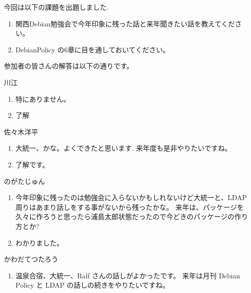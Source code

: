 \documentclass[mingoth,a4paper]{jsarticle}
\begin{document}

今回は以下の課題を出題しました.
\begin{screen}
  \begin{enumerate}
  \item 関西Debian勉強会で今年印象に残った話と来年聞きたい話を教えてください。
  \item DebianPolicy の6章に目を通しておいてください。
  \end{enumerate}
\end{screen}

参加者の皆さんの解答は以下の通りです。
\begin{multicols}{2}
\begin{prework}{ 川江 }
  \begin{enumerate}
  \item 特にありません。
  \item 了解
  \end{enumerate}
\end{prework}\vfill

\begin{prework}{ 佐々木洋平 }
  \begin{enumerate}
  \item 大統一、かな。よくできたと思います. 来年度も是非やりたいですね。
  \item 了解です。
  \end{enumerate}
\end{prework}\vfill

\begin{prework}{ のがたじゅん }
  \begin{enumerate}
  \item 今年印象に残ったのは勉強会に入らないかもしれないけど大統一と、LDAP周りはあまり話しをする事がないから残ったかな。
    来年は、パッケージを久々に作ろうと思ったら浦島太郎状態だったので今どきのパッケージの作り方とか?
  \item わかりました。
  \end{enumerate}
\end{prework}\vfill

\begin{prework}{ かわだてつたろう }
  \begin{enumerate}
  \item 温泉合宿、大統一、Ralf さんの話しがよかったです。
    来年は月刊 Debian Policy と LDAP の話しの続きをやりたいですね。
  \end{enumerate}
\end{prework}\vfill


\end{multicols}
\end{document}
